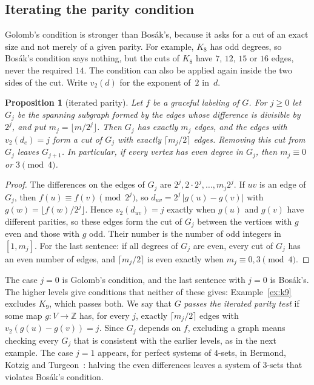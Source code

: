 \documentclass[11pt]{amsart}
\newcommand{\thmmarker}{}
\newcommand{\mnew}{\gdef\thmmarker{\textsuperscript{$\star$}}}
\theoremstyle{tplain}
\newtheorem{proposition}[theorem]{Proposition}
\theoremstyle{tdefinition}
\theoremstyle{tremark}
\newcommand{\ZZ}{\mathbb Z}
\begin{document}
\subsection{Iterating the parity condition}

Golomb's condition is stronger than Bos\'ak's, because it asks for a cut of
an exact size and not merely of a given parity. For example, $K_8$ has odd
degrees, so Bos\'ak's condition says nothing, but the cuts of $K_8$ have $7$,
$12$, $15$ or $16$ edges, never the required $14$. The condition can also be
applied again inside the two sides of the cut. Write $v_2(d)$ for the exponent
of~$2$ in~$d$.

\mnew\begin{proposition}[iterated parity]\label{prop:iterated}
Let $f$ be a graceful labeling of $G$. For $j\ge0$ let $G_j$ be the spanning
subgraph formed by the edges whose difference is divisible by~$2^j$, and put
$m_j=\lfloor m/2^j\rfloor$. Then $G_j$ has exactly $m_j$ edges, and the edges
with $v_2(d_e)=j$ form a cut of $G_j$ with exactly $\lceil m_j/2\rceil$ edges.
Removing this cut from $G_j$ leaves $G_{j+1}$. In particular, if every vertex
has even degree in $G_j$, then $m_j\equiv0$ or $3\pmod4$.
\end{proposition}

\begin{proof}
The differences on the edges of $G_j$ are $2^j,2\cdot2^j,\dots,m_j2^j$. If
$uv$ is an edge of $G_j$, then $f(u)\equiv f(v)\pmod{2^j}$, so
$d_{uv}=2^j\,|g(u)-g(v)|$ with $g(w)=\lfloor f(w)/2^j\rfloor$. Hence
$v_2(d_{uv})=j$ exactly when $g(u)$ and $g(v)$ have different parities, so
these edges form the cut of $G_j$ between the vertices with $g$ even and those
with $g$ odd. Their number is the number of odd integers in $[1,m_j]$. For the
last sentence: if all degrees of $G_j$ are even, every cut of $G_j$ has an even
number of edges, and $\lceil m_j/2\rceil$ is even exactly when
$m_j\equiv0,3\pmod4$.
\end{proof}

The case $j=0$ is Golomb's condition, and the last sentence with $j=0$ is
Bos\'ak's. The higher levels give conditions that neither of these gives:
Example~\ref{ex:k9} excludes $K_9$, which passes both. We say that $G$
\emph{passes the iterated parity test} if some map $g\colon V\to\ZZ$ has, for
every $j$, exactly $\lceil m_j/2\rceil$ edges with $v_2(g(u)-g(v))=j$. Since
$G_j$ depends on $f$, excluding a graph means checking every $G_j$ that is
consistent with the earlier levels, as in the next example. The case
$j=1$ appears, for perfect systems of $4$-sets, in Bermond, Kotzig and
Turgeon~\cite{bkt}: halving the even differences leaves a system of $3$-sets
that violates Bos\'ak's condition.
\end{document}
